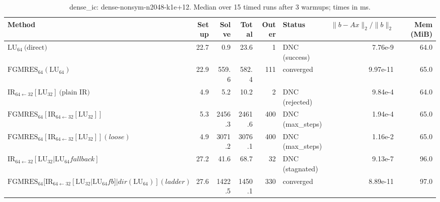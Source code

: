 \begin{table}[t]
\centering
\small
\caption{dense_ic: dense-nonsym-n2048-k1e+12. Median over 15 timed runs after 3 warmups; times in ms.}
\label{tab:dense_ic-dense-nonsym-n2048-k1e+12}
\begin{tabular}{lrrrrlrr}
\hline
Method & Setup & Solve & Total & Outer & Status & $\|b-Ax\|_2/\|b\|_2$ & Mem (MiB) \\
\hline
$\mathrm{LU}_{64}\ \text{(direct)}$ & 22.7 & 0.9 & 23.6 & 1 & DNC (success) & 7.76e-9 & 64.0 \\
$\mathrm{FGMRES}_{64}(\mathrm{LU}_{64})$ & 22.9 & 559.6 & 582.4 & 111 & converged & 9.97e-11 & 65.0 \\
$\mathrm{IR}_{64\leftarrow 32}[\mathrm{LU}_{32}]\ \text{(plain IR)}$ & 4.9 & 5.2 & 10.2 & 2 & DNC (rejected) & 9.84e-4 & 64.0 \\
$\mathrm{FGMRES}_{64}[\mathrm{IR}_{64\leftarrow 32}[\mathrm{LU}_{32}]]$ & 5.3 & 2456.3 & 2461.6 & 400 & DNC (max_steps) & 1.94e-4 & 65.0 \\
$\mathrm{FGMRES}_{64}[\mathrm{IR}_{64\leftarrow 32}[\mathrm{LU}_{32}]] (loose)$ & 4.9 & 3071.2 & 3076.1 & 400 & DNC (max_steps) & 1.16e-2 & 65.0 \\
$\mathrm{IR}_{64\leftarrow 32}[\mathrm{LU}_{32} | \mathrm{LU}_{64} fallback]$ & 27.2 & 41.6 & 68.7 & 32 & DNC (stagnated) & 9.13e-7 & 96.0 \\
$\mathrm{FGMRES}_{64}[\mathrm{IR}_{64\leftarrow 32}[\mathrm{LU}_{32}|\mathrm{LU}_{64} fb]|dir(\mathrm{LU}_{64})] (ladder)$ & 27.6 & 1422.5 & 1450.1 & 330 & converged & 8.89e-11 & 97.0 \\
\hline
\end{tabular}
\end{table}
